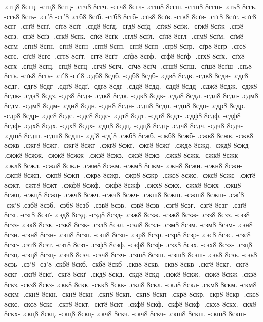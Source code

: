 {.сгц8 8сгц. -сгц8 8сгц-
.сгч8 8сгч. -сгч8 8сгч-
.сгш8 8сгш. -сгш8 8сгш-
.сгь8 8сгь. -сгь8 8сгь-
.сг'8 -сг'8
.сґб8 8сґб. -сґб8 8сґб-
.сґв8 8сґв. -сґв8 8сґв-
.сґг8 8сґг. -сґг8 8сґг-
.сґґ8 8сґґ. -сґґ8 8сґґ-
.сґд8 8сґд. -сґд8 8сґд-
.сґж8 8сґж. -сґж8 8сґж-
.сґз8 8сґз. -сґз8 8сґз-
.сґк8 8сґк. -сґк8 8сґк-
.сґл8 8сґл. -сґл8 8сґл-
.сґм8 8сґм. -сґм8 8сґм-
.сґн8 8сґн. -сґн8 8сґн-
.сґп8 8сґп. -сґп8 8сґп-
.сґр8 8сґр. -сґр8 8сґр-
.сґс8 8сґс. -сґс8 8сґс-
.сґт8 8сґт. -сґт8 8сґт-
.сґф8 8сґф. -сґф8 8сґф-
.сґх8 8сґх. -сґх8 8сґх-
.сґц8 8сґц. -сґц8 8сґц-
.сґч8 8сґч. -сґч8 8сґч-
.сґш8 8сґш. -сґш8 8сґш-
.сґь8 8сґь. -сґь8 8сґь-
.сґ'8 -сґ'8
.сдб8 8сдб. -сдб8 8сдб-
.сдв8 8сдв. -сдв8 8сдв-
.сдг8 8сдг. -сдг8 8сдг-
.сдґ8 8сдґ. -сдґ8 8сдґ-
.сдд8 8сдд. -сдд8 8сдд-
.сдж8 8сдж. -сдж8 8сдж-
.сдз8 8сдз. -сдз8 8сдз-
.сдк8 8сдк. -сдк8 8сдк-
.сдл8 8сдл. -сдл8 8сдл-
.сдм8 8сдм. -сдм8 8сдм-
.сдн8 8сдн. -сдн8 8сдн-
.сдп8 8сдп. -сдп8 8сдп-
.сдр8 8сдр. -сдр8 8сдр-
.сдс8 8сдс. -сдс8 8сдс-
.сдт8 8сдт. -сдт8 8сдт-
.сдф8 8сдф. -сдф8 8сдф-
.сдх8 8сдх. -сдх8 8сдх-
.сдц8 8сдц. -сдц8 8сдц-
.сдч8 8сдч. -сдч8 8сдч-
.сдш8 8сдш. -сдш8 8сдш-
.сд'8 -сд'8
.сжб8 8сжб. -сжб8 8сжб-
.сжв8 8сжв. -сжв8 8сжв-
.сжг8 8сжг. -сжг8 8сжг-
.сжґ8 8сжґ. -сжґ8 8сжґ-
.сжд8 8сжд. -сжд8 8сжд-
.сжж8 8сжж. -сжж8 8сжж-
.сжз8 8сжз. -сжз8 8сжз-
.сжк8 8сжк. -сжк8 8сжк-
.сжл8 8сжл. -сжл8 8сжл-
.сжм8 8сжм. -сжм8 8сжм-
.сжн8 8сжн. -сжн8 8сжн-
.сжп8 8сжп. -сжп8 8сжп-
.сжр8 8сжр. -сжр8 8сжр-
.сжс8 8сжс. -сжс8 8сжс-
.сжт8 8сжт. -сжт8 8сжт-
.сжф8 8сжф. -сжф8 8сжф-
.сжх8 8сжх. -сжх8 8сжх-
.сжц8 8сжц. -сжц8 8сжц-
.сжч8 8сжч. -сжч8 8сжч-
.сжш8 8сжш. -сжш8 8сжш-
.сж'8 -сж'8
.сзб8 8сзб. -сзб8 8сзб-
.сзв8 8сзв. -сзв8 8сзв-
.сзг8 8сзг. -сзг8 8сзг-
.сзґ8 8сзґ. -сзґ8 8сзґ-
.сзд8 8сзд. -сзд8 8сзд-
.сзж8 8сзж. -сзж8 8сзж-
.сзз8 8сзз. -сзз8 8сзз-
.сзк8 8сзк. -сзк8 8сзк-
.сзл8 8сзл. -сзл8 8сзл-
.сзм8 8сзм. -сзм8 8сзм-
.сзн8 8сзн. -сзн8 8сзн-
.сзп8 8сзп. -сзп8 8сзп-
.сзр8 8сзр. -сзр8 8сзр-
.сзс8 8сзс. -сзс8 8сзс-
.сзт8 8сзт. -сзт8 8сзт-
.сзф8 8сзф. -сзф8 8сзф-
.сзх8 8сзх. -сзх8 8сзх-
.сзц8 8сзц. -сзц8 8сзц-
.сзч8 8сзч. -сзч8 8сзч-
.сзш8 8сзш. -сзш8 8сзш-
.сзь8 8сзь. -сзь8 8сзь-
.сз'8 -сз'8
.скб8 8скб. -скб8 8скб-
.скв8 8скв. -скв8 8скв-
.скг8 8скг. -скг8 8скг-
.скґ8 8скґ. -скґ8 8скґ-
.скд8 8скд. -скд8 8скд-
.скж8 8скж. -скж8 8скж-
.скз8 8скз. -скз8 8скз-
.скк8 8скк. -скк8 8скк-
.скл8 8скл. -скл8 8скл-
.скм8 8скм. -скм8 8скм-
.скн8 8скн. -скн8 8скн-
.скп8 8скп. -скп8 8скп-
.скр8 8скр. -скр8 8скр-
.скс8 8скс. -скс8 8скс-
.скт8 8скт. -скт8 8скт-
.скф8 8скф. -скф8 8скф-
.скх8 8скх. -скх8 8скх-
.скц8 8скц. -скц8 8скц-
.скч8 8скч. -скч8 8скч-
.скш8 8скш. -скш8 8скш-
}
